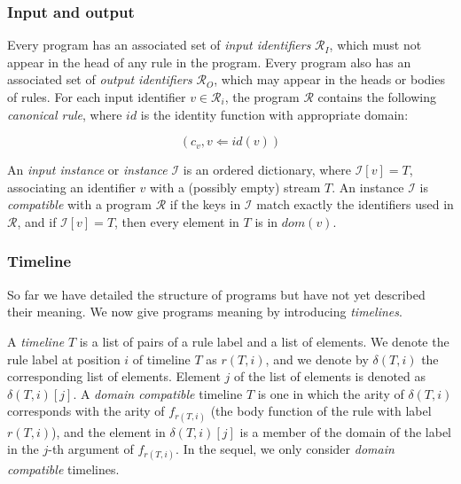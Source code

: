 \subsubsection{Input and output}

Every program has an associated set of {\em input identifiers} $\mathcal{R}_I$, which must not appear in the head of any rule in the program.  Every program also has an associated set of {\em output identifiers} $\mathcal{R}_O$, which may appear in the heads or bodies of rules.  For each input identifier $v \in \mathcal{R}_i$, the program $\mathcal{R}$ contains the following {\em canonical rule}, where $id$ is the identity function with appropriate domain:

$$(c_v, v \Leftarrow id(v)) $$

An {\em input instance} or {\em instance} $\mathcal{I}$ is an ordered dictionary, where $\mathcal{I}[v] = T$, associating an identifier $v$ with a (possibly empty) stream $T$.  An instance $\mathcal{I}$ is {\em compatible} with a program $\mathcal{R}$ if the keys in $\mathcal{I}$ match exactly the identifiers used in $\mathcal{R}$, and if $\mathcal{I}[v] = T$, then every element in $T$ is in $dom(v)$.

\subsubsection{Timeline}

So far we have detailed the structure of programs but have not yet described their meaning.  We now give programs meaning by introducing {\em timelines}.

A {\em timeline} $T$ is a list of pairs of a rule label and a list of elements.  We denote the rule label at position $i$ of timeline $T$ as $r(T, i)$, and we denote by $\delta(T, i)$ the corresponding list of elements.  Element $j$ of the list of elements is denoted as $\delta(T,i)[j]$.  A {\em domain compatible} timeline $T$ is one in which the arity of $\delta(T, i)$ corresponds with the arity of $f_{r(T,i)}$ (the body function of the rule with label $r(T,i)$), and the element in $\delta(T,i)[j]$ is a member of the domain of the label in the $j$-th argument of $f_{r(T,i)}$.  In the sequel, we only consider {\em domain compatible} timelines.


